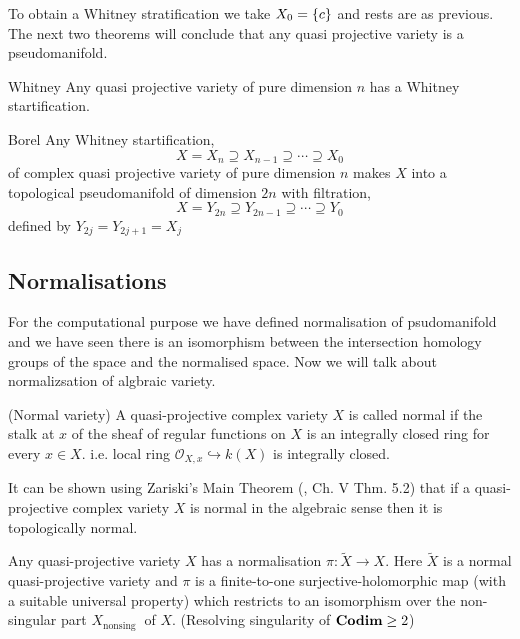 \documentclass[11pt]{article}
\begin{document}
\noindent To obtain a Whitney stratification we take $X_0 =\qty{c}$ and rests are as previous. The next two theorems will conclude that any quasi projective variety is a pseudomanifold.

\begin{Thm}{\cite{whit_1965} Whitney}{}
    Any quasi projective variety of pure dimension $n$ has a Whitney startification.
\end{Thm}

\begin{Thm}{\cite{borelintersection} Borel}{}
    Any Whitney startification, $$X=X_n\supseteq X_{n-1}\supseteq \cdots \supseteq X_0$$ of complex quasi projective variety of pure dimension $n$ makes $X$ into a topological pseudomanifold of dimension $2n$ with filtration, $$X=Y_{2n}\supseteq Y_{2n-1}\supseteq \cdots \supseteq Y_0$$ defined by $Y_{2j}=Y_{2j+1}=X_j$
\end{Thm}

\subsection{Normalisations}

For the computational purpose we have defined normalisation of psudomanifold and we have seen there is an isomorphism between the intersection homology groups of the space and the normalised space. Now we will talk about normalizsation of algbraic variety. 

\begin{Def}{(Normal variety) }{}
    A quasi-projective complex variety $X$ is called normal if the stalk at $x$ of the sheaf of regular functions on $X$ is an integrally closed ring for every $x \in X$. i.e. local ring $\mathscr{O}_{X,x} \hookrightarrow k(X)$ is integrally closed.
\end{Def}
\noindent It can be shown using Zariski's Main Theorem (\cite{hartshorne2013algebraic}, Ch. V Thm. 5.2) that if a quasi-projective complex variety $X$ is normal in the algebraic sense then it is topologically normal.

\vspace*{0.2cm}

\noindent Any quasi-projective variety $X$ has a normalisation $\pi: \tilde{X} \rightarrow X$. Here $\tilde{X}$ is a normal quasi-projective variety and $\pi$ is a finite-to-one surjective-holomorphic map (with a suitable universal property) which restricts to an isomorphism over the non-singular part $X_{\text {nonsing }}$ of $X$. (Resolving singularity of $\mathbf{Codim} \geq 2$)
\end{document}
